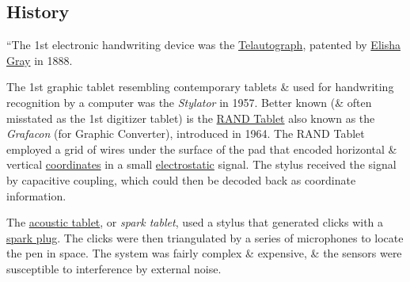 \documentclass[oneside]{book}
\numberwithin{equation}{section}
\begin{document}
\subsection{History}
``The 1st electronic handwriting device was the \href{https://en.wikipedia.org/wiki/Telautograph}{Telautograph}, patented by \href{https://en.wikipedia.org/wiki/Elisha_Gray}{Elisha Gray} in 1888.

The 1st graphic tablet resembling contemporary tablets \& used for handwriting recognition by a computer was the \textit{Stylator} in 1957. Better known (\& often misstated as the 1st digitizer tablet) is the \href{https://en.wikipedia.org/wiki/RAND_Tablet}{RAND Tablet} also known as the \textit{Grafacon} (for Graphic Converter), introduced in 1964. The RAND Tablet employed a grid of wires under the surface of the pad that encoded horizontal \& vertical \href{https://en.wikipedia.org/wiki/Coordinates}{coordinates} in a small \href{https://en.wikipedia.org/wiki/Electrostatic}{electrostatic} signal. The stylus received the signal by capacitive coupling, which could then be decoded back as coordinate information.

The \href{https://en.wikipedia.org/wiki/Acoustic_tablet}{acoustic tablet}, or \textit{spark tablet}, used a stylus that generated clicks with a \href{https://en.wikipedia.org/wiki/Spark_plug}{spark plug}. The clicks were then triangulated by a series of microphones to locate the pen in space. The system was fairly complex \& expensive, \& the sensors were susceptible to interference by external noise.
\end{document}
